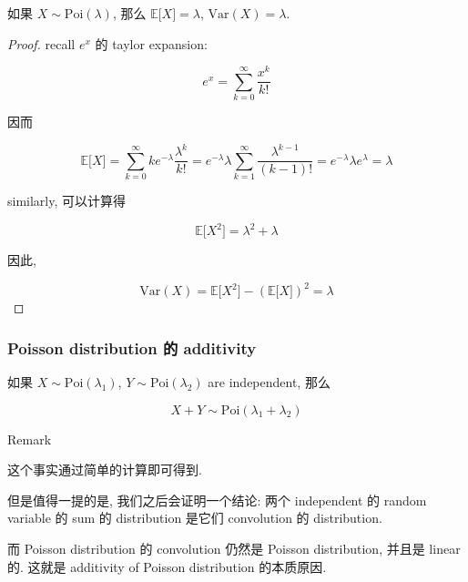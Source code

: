 \begin{proposition}

如果 \(\mathit{X} \sim \text{Poi}(\mathit{\lambda})\), 那么 \(\mathbb{E}\lbrack\mathit{X}\rbrack = \mathit{\lambda}\), \(\text{Var}(\mathit{X}) = \mathit{\lambda}\).

\end{proposition}

\begin{proof}

recall \(\mathit{e}^{\mathit{x}}\) 的 taylor expansion:

\[\mathit{e}^{\mathit{x}} = \sum\limits_{\mathit{k} = 0}^{\infty}\frac{\mathit{x}^{\mathit{k}}}{\mathit{k}!}\]

因而

\[\mathbb{E}\lbrack\mathit{X}\rbrack = \sum\limits_{\mathit{k} = 0}^{\infty}\mathit{k}\mathit{e}^{- \mathit{\lambda}}\frac{\mathit{\lambda}^{\mathit{k}}}{\mathit{k}!} = \mathit{e}^{- \mathit{\lambda}}\mathit{\lambda}\sum\limits_{\mathit{k} = 1}^{\infty}\frac{\mathit{\lambda}^{\mathit{k} - 1}}{(\mathit{k} - 1)!} = \mathit{e}^{- \mathit{\lambda}}\mathit{\lambda}\mathit{e}^{\mathit{\lambda}} = \mathit{\lambda}\]

similarly, 可以计算得

\[\mathbb{E}\lbrack\mathit{X}^{2}\rbrack = \mathit{\lambda}^{2} + \mathit{\lambda}\]

因此,

\[\text{Var}(\mathit{X}) = \mathbb{E}\lbrack\mathit{X}^{2}\rbrack - (\mathbb{E}\lbrack\mathit{X}\rbrack)^{2} = \mathit{\lambda}\]

\end{proof}

\subsubsection{Poisson distribution 的 additivity}\label{poisson-distribution-ux7684-additivity}

\begin{theorem}{}

如果 \(\mathit{X} \sim \text{Poi}(\mathit{\lambda}_{1})\), \(\mathit{Y} \sim \text{Poi}(\mathit{\lambda}_{2})\) are independent, 那么

\[\mathit{X} + \mathit{Y} \sim \text{Poi}(\mathit{\lambda}_{1} + \mathit{\lambda}_{2})\]

\end{theorem}

\begin{qlremark}{Remark}

这个事实通过简单的计算即可得到.

但是值得一提的是, 我们之后会证明一个结论: 两个 independent 的 random variable 的 sum 的 distribution 是它们 convolution 的 distribution.

而 Poisson distribution 的 convolution 仍然是 Poisson distribution, 并且是 linear 的. 这就是 additivity of Poisson distribution 的本质原因.

\end{qlremark}

